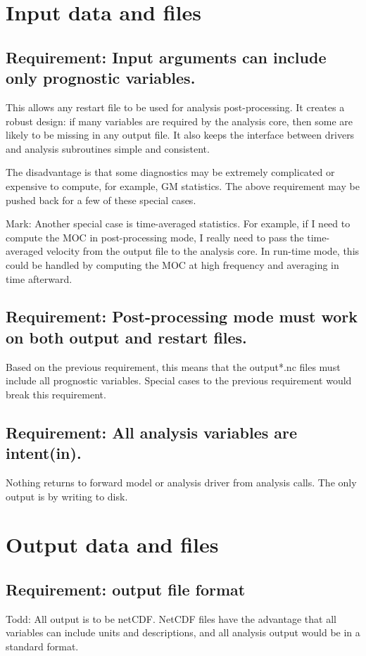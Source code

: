 \documentclass[11pt]{report}
\begin{document}
\newpage
\section{Input data and files}
\subsection{{\color{red} Requirement:} Input arguments can include only prognostic variables.}
This allows any restart file to be used for analysis post-processing.  It creates a robust design: if many variables are required by the analysis core, then some are likely to be missing in any output file.  It also keeps the interface between drivers and analysis subroutines simple and consistent.

The disadvantage is that some diagnostics may be extremely complicated or expensive to compute, for example, GM statistics.  The above requirement may be pushed back for a few of these special cases.

Mark: Another special case is time-averaged statistics.  For example, if I need to compute the MOC in post-processing mode, I really need to pass the time-averaged velocity from the output file to the analysis core.  In run-time mode, this could be handled by computing the MOC at high frequency and averaging in time afterward.

\subsection{{\color{red} Requirement:} Post-processing mode must work on both output and restart files.}
Based on the previous requirement, this means that the output*.nc files must include all prognostic variables.  Special cases to the previous requirement would break this requirement.

\subsection{{\color{green} Requirement:} All analysis variables are intent(in).}
Nothing returns to forward model or analysis driver from analysis calls.  The only output is by writing to disk.

\newpage
\section{Output data and files}
\subsection{{\color{red} Requirement:} output file format}
Todd: All output is to be netCDF.  NetCDF files have the advantage that all variables can include units and descriptions, and all analysis output would be in a standard format.
\end{document}
